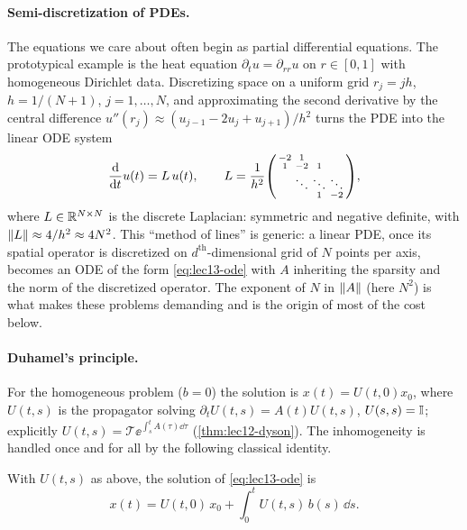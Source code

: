 \paragraph{Semi-discretization of PDEs.}
The equations we care about often begin as partial differential equations. The prototypical
example is the heat equation $\partial_t u=\partial_{rr}u$ on $r\in[0,1]$ with homogeneous
Dirichlet data. Discretizing space on a uniform grid $r_j=jh$, $h=1/(N{+}1)$,
$j=1,\dots,N$, and approximating the second derivative by the central difference
$u''(r_j)\approx(u_{j-1}-2u_j+u_{j+1})/h^2$ turns the PDE into the linear ODE system
\begin{equation}
  \frac{\mathrm{d}}{\mathrm{d} t}u(t)=L\,u(t),
  \qquad
  L=\frac{1}{h^2}
  \begin{psmallmatrix}
    -2 & 1 & & \\ 1 & -2 & 1 & \\ & \ddots & \ddots & \ddots \\ & & 1 & -2
  \end{psmallmatrix},
  \label{eq:lec13-semidiscrete}
\end{equation}
where $L\in\mathbb{R}^{N\times N}$ is the discrete Laplacian: symmetric and negative definite, with
$\left\lVert L \right\rVert\approx4/h^2\approx4N^2$. This ``method of lines'' is generic: a linear PDE, once its
spatial operator is discretized on $d^{\mathrm{th}}$-dimensional grid of $N$ points per axis,
becomes an ODE of the form \eqref{eq:lec13-ode} with $A$ inheriting the sparsity and the norm
of the discretized operator. The exponent of $N$ in $\left\lVert A \right\rVert$ (here $N^2$) is what makes these
problems demanding and is the origin of most of the cost below.

\paragraph{Duhamel's principle.}
For the homogeneous problem ($b=0$) the solution is $x(t)=U(t,0)x_0$, where $U(t,s)$ is the
propagator solving $\partial_t U(t,s)=A(t)U(t,s)$, $U(s,s)=\mathbb{I}$; explicitly $U(t,s)=\mathcal T
\ee^{\int_s^t A(\tau)\dd\tau}$ (\cref{thm:lec12-dyson}). The inhomogeneity is handled once and
for all by the following classical identity.

\begin{proposition}
\label{prop:lec13-duhamel}
With $U(t,s)$ as above, the solution of \eqref{eq:lec13-ode} is
\begin{equation}
  x(t)=U(t,0)\,x_0+\int_0^t U(t,s)\,b(s)\,\dd s.
  \label{eq:lec13-duhamel}
\end{equation}
\end{proposition}

